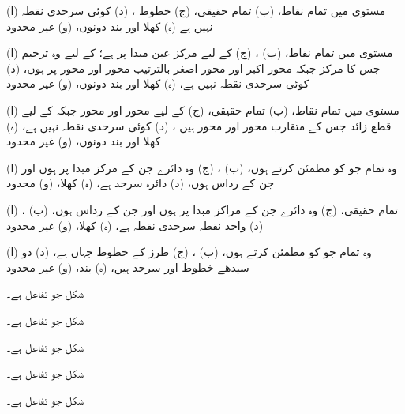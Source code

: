 \begin {description}\setlength {\parskip }{0pt} \setlength {\itemsep }{0pt plus 1pt}
\item [
\protect ۱)
]
 (ا) مستوی  میں تمام نقاط، (ب) تمام حقیقی، (ج) خطوط ، (د) کوئی سرحدی نقطہ نہیں ہے (ہ) کھلا اور بند دونوں، (و) غیر محدود 
\item [
\protect ۳)
]
 (ا) مستوی  میں تمام نقاط، (ب) ، (ج)  کے لیے مرکز عین مبدا پر ہے؛  کے لیے وہ ترخیم جس کا مرکز  جبکہ محور اکبر اور محور اصغر بالترتیب محور  اور محور  پر ہوں، (د) کوئی سرحدی نقطہ نہیں ہے، (ہ) کھلا اور بند دونوں، (و) غیر محدود 
\item [
\protect ۵)
]
 (ا) مستوی  میں تمام نقاط، (ب) تمام حقیقی، (ج)  کے لیے محور  اور محور  جبکہ  کے لیے قطع زائد جس کے متقارب محور  اور محور  ہیں ، (د) کوئی سرحدی نقطہ نہیں ہے، (ہ) کھلا اور بند دونوں، (و) غیر محدود 
\item [
\protect ۷)
]
 (ا) وہ تمام  جو  کو مطمئن کرتے ہوں، (ب) ، (ج) وہ دائرے جن کے مرکز مبدا پر ہوں اور جن کے رداس  ہوں، (د) دائرہ  سرحد ہے، (ہ) کھلا، (و) محدود 
\item [
\protect ۹)
]
 (ا) ، (ب) تمام حقیقی، (ج) وہ دائرے جن کے مراکز مبدا پر ہوں اور جن کے رداس  ہوں، (د) واحد نقطہ  سرحدی نقطہ ہے، (ہ) کھلا، (و) غیر محدود 
\item [
\protect ۱۱)
]
 (ا) وہ تمام  جو  کو مطمئن کرتے ہوں، (ب) ، (ج)  طرز کے خطوط جہاں  ہے، (د) دو سیدھے خطوط  اور  سرحد ہیں، (ہ) بند، (و) غیر محدود 
\item [
\protect ۱۳)
]
 شکل  جو تفاعل  ہے۔ 
\item [
\protect ۱۴)
]
 شکل  جو تفاعل  ہے۔ 
\item [
\protect ۱۵)
]
 شکل  جو تفاعل  ہے۔ 
\item [
\protect ۱۶)
]
 شکل  جو تفاعل  ہے۔ 
\item [
\protect ۱۷)
]
 شکل  جو تفاعل  ہے۔ 

\end{description}
